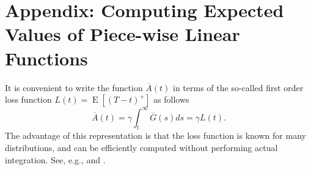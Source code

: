 \documentclass[twoside,USenglish,10pt]{article}
\newcommand{\eg}{e.g.\xspace}
\newcommand{\Ab}{\overline{A}\xspace}
\newcommand{\Gb}{\overline{G}\xspace}
\DeclareMathOperator{\Exp}{E}       %
\newcommand{\E}[1]{\Exp\left[{#1}\right]}       %
\begin{document}
\appendix

\section{Appendix: Computing Expected Values of Piece-wise Linear Functions} \label{app:piecewise}
It is convenient to write the function  $\Ab(t)$ in terms of the so-called first order loss function $L(t)=\E{(T-t)^+}$ as follows
\[ \Ab(t) = \gamma \int_t^\infty \Gb(s)ds = \gamma L(t).\]
The advantage of this representation is that the loss function is known for many distributions, and can be efficiently computed without performing actual integration. See, \eg, \cite[Page 14]{burn.ea.10} and \cite[Appendix C]{zipk00}.
\end{document}
